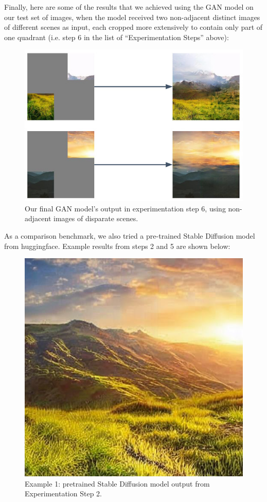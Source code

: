 \documentclass[sigconf]{acmart}
\begin{document}
Finally, here are some of the results that we achieved using the GAN model on our test set of images, when the model received two non-adjacent distinct images of different scenes as input, each cropped more extensively to contain only part of one quadrant (i.e. step 6 in the list of “Experimentation Steps” above):

\begin{figure}[h!]
    \centering
    \includegraphics[width=\linewidth]{gan_step_6}
    \caption{Our final GAN model's output in experimentation step 6, using non-adjacent images of disparate scenes.}
    \label{fig:gan_step_6}
\end{figure}

As a comparison benchmark, we also tried a pre-trained Stable Diffusion model from huggingface. Example results from steps 2 and 5 are shown below:

\begin{figure}[h!]
    \centering
    \includegraphics[width=\linewidth]{stable_diffusion_step_2_1}
    \caption{Example 1: pretrained Stable Diffusion model output from Experimentation Step 2.}
    \label{fig:stable_diffusion_step_2_1}
\end{figure}
\end{document}
